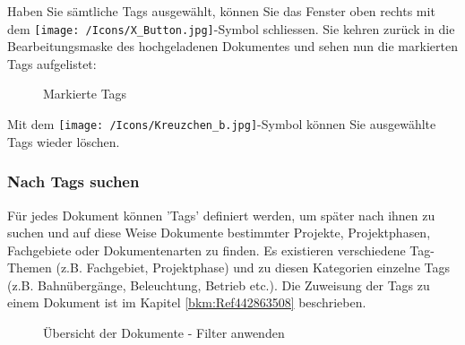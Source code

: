 Haben Sie sämtliche Tags ausgewählt, können Sie das Fenster oben rechts mit dem \texttt{[image: /Icons/X\_Button.jpg]}-Symbol schliessen. Sie kehren zurück in die Bearbeitungsmaske des hochgeladenen Dokumentes und sehen nun die markierten Tags aufgelistet:

\begin{figure}[H]
\caption{Markierte Tags}
\end{figure}

Mit dem \texttt{[image: /Icons/Kreuzchen\_b.jpg]}-Symbol  können Sie ausgewählte Tags wieder löschen.
 



\subsubsection{Nach Tags suchen}
\label{bkm:Ref442275849}

Für jedes Dokument können 'Tags' definiert werden, um später nach ihnen zu suchen und auf diese Weise Dokumente bestimmter Projekte, Projektphasen, Fachgebiete oder Dokumentenarten zu finden. Es existieren verschiedene Tag-Themen (z.B. Fachgebiet, Projektphase) und zu diesen Kategorien einzelne Tags (z.B. Bahnübergänge, Beleuchtung, Betrieb etc.). Die Zuweisung der Tags zu einem Dokument ist im Kapitel \ref{bkm:Ref442863508} beschrieben.

\begin{figure}[H]
\caption{Übersicht der Dokumente - Filter anwenden}
\end{figure}

